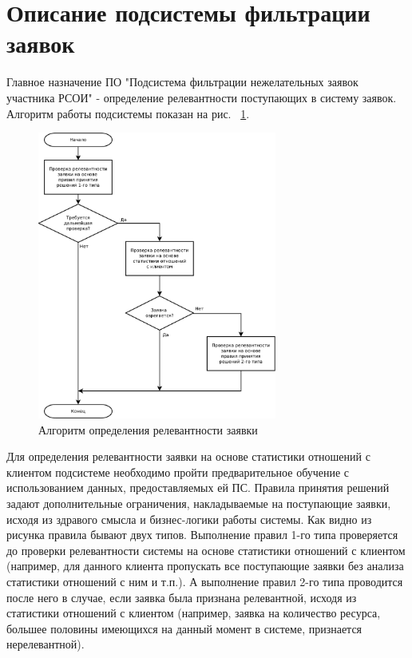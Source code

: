 \documentclass[utf8x, 12pt]{G7-32}
\begin{document}
\section{Описание подсистемы фильтрации заявок}
	Главное назначение ПО "Подсистема фильтрации нежелательных заявок участника 
РСОИ" - определение релевантности поступающих в систему заявок. Алгоритм работы 
подсистемы показан на рис. ~\ref{fig:algorithm}.
\begin{figure}
        \centering
        \includegraphics[width=0.7\textwidth]{inc/dia/rpz-algorithm}
        \caption{Алгоритм определения релевантности заявки}
        \label{fig:algorithm}
\end{figure}
Для определения релевантности заявки на основе статистики отношений с клиентом
подсистеме необходимо пройти предварительное обучение с использованием данных,
предоставляемых ей ПС. Правила принятия решений задают дополнительные 
ограничения, накладываемые на поступающие заявки, исходя из здравого смысла и 
бизнес-логики работы системы. Как видно из рисунка правила бывают двух типов.
Выполнение правил 1-го типа проверяется до проверки релевантности системы на
основе статистики отношений с клиентом (например, для данного клиента  
пропускать все поступающие заявки без анализа статистики отношений с ним и т.п.). 
А выполнение правил 2-го типа проводится после него в случае, если заявка была
признана релевантной, исходя из статистики отношений с клиентом (например, заявка на 
количество ресурса, большее половины имеющихся на данный момент в системе, 
признается нерелевантной).
\end{document}
